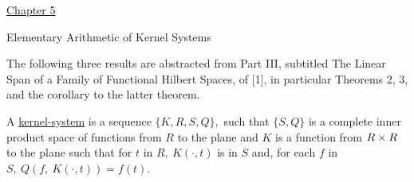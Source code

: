

\begin{center}
\underline{Chapter 5}
\end{center}
\begin{center}
\begin{large}
Elementary Arithmetic of Kernel Systems
\end{large}
\end{center}
The following three results are abstracted from Part III,  subtitled  The Linear Span of a Family of Functional
Hilbert Spaces, of [1], in particular Theorems 2, 3, and the corollary to the latter theorem.\nl

A \underline{kernel-system} is a sequence $\{K,R, S,Q\},$ such that $\{S,Q\}$ is a complete inner product space of functions from $R$ to the plane and $K$ is a function from $R\times R$ to the plane such that for $t$ in $R,~K(\cdot ,t)$ is in $S$ and, for each $f$ in $S,~Q(f,~K(\cdot ,t)) = f(t).$\nl

